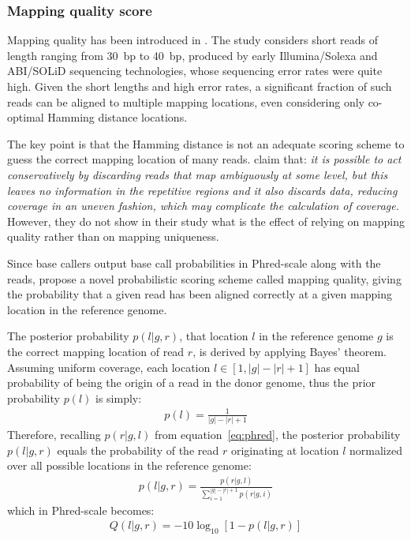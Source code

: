 \subsubsection{Mapping quality score}
\label{sub:mapqual}

Mapping quality has been introduced in \citep{Li2008}.
The study considers short reads of length ranging from 30~bp to 40~bp, produced by early Illumina/Solexa and ABI/SOLiD sequencing technologies, whose sequencing error rates were quite high.
Given the short lengths and high error rates, a significant fraction of such reads can be aligned to multiple mapping locations, even considering only co-optimal Hamming distance locations.

The key point is that the Hamming distance is not an adequate scoring scheme to guess the correct mapping location of many reads.
\citeauthor{Li2008} claim that: \emph{it is possible to act conservatively by discarding reads that map ambiguously at some level, but this leaves no information in the repetitive regions and it also discards data, reducing coverage in an uneven fashion, which may complicate the calculation of coverage.}
However, they do not show in their study what is the effect of relying on mapping quality rather than on mapping uniqueness.

Since base callers output base call probabilities in Phred-scale along with the reads, \citeauthor{Li2008} propose a novel probabilistic scoring scheme called mapping quality, giving the probability that a given read has been aligned correctly at a given mapping location in the reference genome.

The posterior probability $p(l|g,r)$, that location $l$ in the reference genome $g$ is the correct mapping location of read $r$, is derived by applying Bayes' theorem.
Assuming uniform coverage, each location $l \in [1, |g| - |r| + 1]$ has equal probability of being the origin of a read in the donor genome, thus the prior probability $p(l)$ is simply:
\begin{eqnarray}
p(l) = \frac{1}{|g| - |r| + 1}
\end{eqnarray}
Therefore, recalling $p(r | g, l)$ from equation~\ref{eq:phred}, the posterior probability $p(l|g,r)$ equals the probability of the read $r$ originating at location $l$ normalized over all possible locations in the reference genome:
\begin{eqnarray}
\label{eq:mapprob}
p(l|g,r) = \frac{p(r|g,l)}{\sum_{i=1}^{|g| - |r| + 1}{p(r|g,i)}}
\end{eqnarray}
which in Phred-scale becomes:
\begin{eqnarray}
\label{eq:mapqual}
Q(l|g,r) = -10 \log_{10}[1 - p(l|g,r)]
\end{eqnarray}

